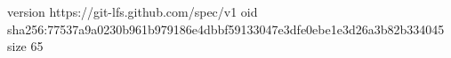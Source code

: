 version https://git-lfs.github.com/spec/v1
oid sha256:77537a9a0230b961b979186e4dbbf59133047e3dfe0ebe1e3d26a3b82b334045
size 65
